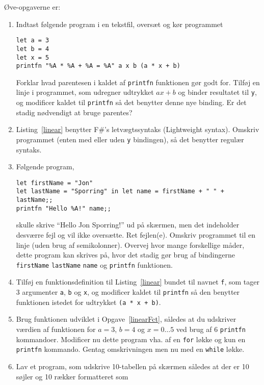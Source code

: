 \documentclass[a4paper,12pt]{article}
\begin{document}
Øve-opgaverne er:
\begin{enumerate}[label=3ø.\arabic*,start=0]
\item Indtast følgende program i en tekstfil, oversæt og kør programmet 
\begin{lstlisting}[caption=Expression for a line,label=linear]
let a = 3
let b = 4
let x = 5
printfn "%A * %A + %A = %A" a x b (a * x + b)
\end{lstlisting}
Forklar hvad parentesen i kaldet af \lstinline!printfn! funktionen gør godt for. Tilføj en linje i programmet, som udregner udtrykket $ax+b$ og binder resultatet til \lstinline!y!, og modificer kaldet til \lstinline!printfn! så det benytter denne nye binding. Er det stadig nødvendigt at bruge parentes?
\item Listing~\ref{linear} benytter F\#'s letvægtssyntaks (Lightweight syntax). Omskriv programmet (enten med eller uden \lstinline!y! bindingen), så det benytter regulær syntaks.
\item Følgende program,
\begin{lstlisting}
let firstName = "Jon"
let lastName = "Sporring" in let name = firstName + " " + lastName;;
printfn "Hello %A!" name;;
\end{lstlisting}
skulle skrive "`Hello Jon Sporring!"' ud på skærmen, men det indeholder desværre fejl og vil ikke oversætte. Ret fejlen(e). Omskriv programmet til en linje (uden brug af semikolonner). Overvej hvor mange forskellige måder, dette program kan skrives på, hvor det stadig gør brug af bindingerne \lstinline!firstName! \lstinline!lastName! \lstinline!name! og \lstinline!printfn! funktionen. 
\item \label{linearFct} Tilføj en funktionsdefinition til Listing~\ref{linear} bundet til navnet \lstinline!f!, som tager 3 argumenter \lstinline!a!, \lstinline!b! og \lstinline!x!, og modificer kaldet til \lstinline!printfn! så den benytter funktionen istedet for udtrykket \lstinline!(a * x + b)!.
\item \label{table} Brug funktionen udviklet i Opgave~\ref{linearFct}, således at du udskriver værdien af funktionen for $a=3$, $b=4$ og $x=0\ldots5$ ved brug af 6 \lstinline!printfn! kommandoer. Modificer nu dette program vha. af en \lstinline!for! løkke og kun en \lstinline!printfn! kommando. Gentag omskrivningen men nu med en \lstinline!while! løkke.
\item \label{multiplicationTable} Lav et program, som udskrive 10-tabellen på skærmen således at der er 10 søjler og 10 rækker formatteret som
  \begin{center}

\end{center}
\end{enumerate}
\end{document}
